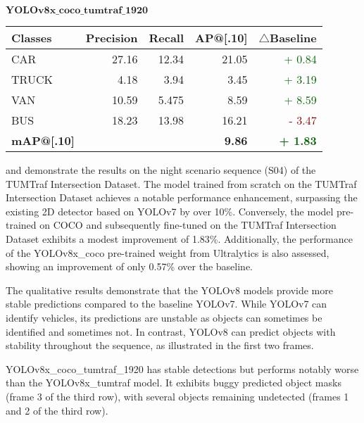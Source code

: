 \begin{table}[htb]
	\vspace{2em} %
	\begin{minipage}[t]{0.48\textwidth}
		\centering 
		$\bm{YOLOv8x\_coco\_tumtraf\_1920}$\\
		\begin{tabular}{lrrrr}
			\toprule
			\textbf{Classes} & \textbf{Precision} & \textbf{Recall} & \textbf{AP@[.10]} & \textbf{$\triangle$Baseline} \\
			\midrule
			CAR & 27.16 & 12.34 & 21.05 &  \textcolor{darkgreen}{+ 0.84}\\
			TRUCK & 4.18 & 3.94 & 3.45 &  \textcolor{darkgreen}{+ 3.19}\\
			VAN & 10.59 & 5.475 & 8.59 &  \textcolor{darkgreen}{+ 8.59}\\
			BUS & 18.23 & 13.98 & 16.21 &  \textcolor{darkred}{- 3.47}\\
			\midrule
			\textbf{mAP@[.10]} & \textbf{} & \textbf{} & \textbf{9.86}   & \textbf{\textcolor{darkgreen}{+ 1.83}} \\
			\bottomrule
		\end{tabular}
	\end{minipage}
	
	\label{tab:night_sequence}
\end{table}

 and  demonstrate the results on the night scenario sequence (S04) of the TUMTraf Intersection Dataset. The model trained from scratch on the TUMTraf Intersection Dataset achieves a notable performance enhancement, surpassing the existing 2D detector based on YOLOv7 by over 10\%. Conversely, the model pre-trained on COCO and subsequently fine-tuned on the TUMTraf Intersection Dataset exhibits a modest improvement of 1.83\%. Additionally, the performance of the YOLOv8x\_coco pre-trained weight from Ultralytics is also assessed, showing an improvement of only 0.57\% over the baseline.

The qualitative results demonstrate that the YOLOv8 models provide more stable predictions compared to the baseline YOLOv7. While YOLOv7 can identify vehicles, its predictions are unstable as objects can sometimes be identified and sometimes not. In contrast, YOLOv8 can predict objects with stability throughout the sequence, as illustrated in the first two frames.

YOLOv8x\_coco\_tumtraf\_1920 has stable detections but performs notably worse than the YOLOv8x\_tumtraf model. It exhibits buggy predicted object masks (frame 3 of the third row), with several objects remaining undetected (frames 1 and 2 of the third row).

